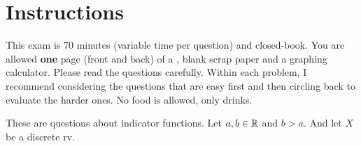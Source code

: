 \documentclass[12pt,landscape]{article}
\begin{document}
\section*{Instructions}
This exam is 70 minutes (variable time per question) and closed-book. You are allowed \textbf{one} page (front and back) of a , blank scrap paper and a graphing calculator. Please read the questions carefully. Within each problem, I recommend considering the questions that are easy first and then circling back to evaluate the harder ones. No food is allowed, only drinks. %

\pagebreak

\problem{} These are questions about indicator functions. Let $a,b \in \mathbb{R}$ and $b > a$. And let $X$ be a discrete rv.

\vspace{-0.2cm}\benum{} 
\end{document}
